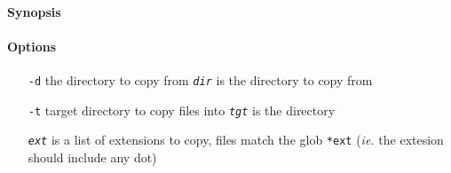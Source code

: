 \documentclass[12pt,a4paper]{article}
\begin{document}
\paragraph{Synopsis}   
\paragraph{Options}\begin{itemize}
  \item[\texttt{-d}] the directory to copy from \texttt{\emph{dir}} is the directory to copy from
  \item[\texttt{-t}] target directory to copy files into \texttt{\emph{tgt}} is the directory
  \item[\texttt{\emph{ext}}] is a list of extensions to copy, files match the glob \texttt{*ext} (\emph{ie.} the extesion should include any dot)
\end{itemize}

\begin{tcolorbox}
  
\end{tcolorbox}
\end{document}

